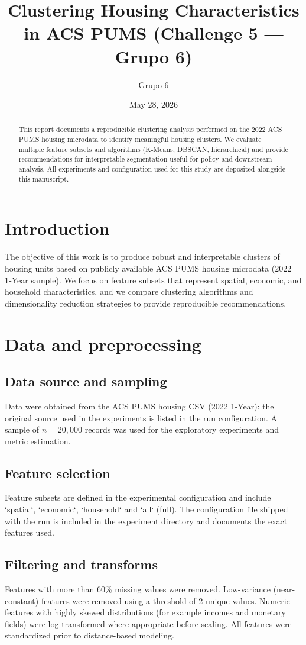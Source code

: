 \documentclass[11pt,a4paper]{article}
\title{Clustering Housing Characteristics in ACS PUMS (Challenge 5 — Grupo 6)}
\author{Grupo 6}
\date{May 28, 2026}
\begin{document}
\maketitle

\begin{abstract}
This report documents a reproducible clustering analysis performed on the 2022 ACS PUMS housing microdata to identify meaningful housing clusters. We evaluate multiple feature subsets and algorithms (K‑Means, DBSCAN, hierarchical) and provide recommendations for interpretable segmentation useful for policy and downstream analysis. All experiments and configuration used for this study are deposited alongside this manuscript.
\end{abstract}

\section{Introduction}
The objective of this work is to produce robust and interpretable clusters of housing units based on publicly available ACS PUMS housing microdata (2022 1‑Year sample). We focus on feature subsets that represent spatial, economic, and household characteristics, and we compare clustering algorithms and dimensionality reduction strategies to provide reproducible recommendations.

\section{Data and preprocessing}
\subsection{Data source and sampling}
Data were obtained from the ACS PUMS housing CSV (2022 1‑Year): the original source used in the experiments is listed in the run configuration. A sample of $n=20{,}000$ records was used for the exploratory experiments and metric estimation.

\subsection{Feature selection}
Feature subsets are defined in the experimental configuration and include `spatial`, `economic`, `household` and `all` (full). The configuration file shipped with the run is included in the experiment directory and documents the exact features used.

\subsection{Filtering and transforms}
Features with more than 60\% missing values were removed. Low-variance (near-constant) features were removed using a threshold of 2 unique values. Numeric features with highly skewed distributions (for example incomes and monetary fields) were log-transformed where appropriate before scaling. All features were standardized prior to distance-based modeling.
\end{document}

